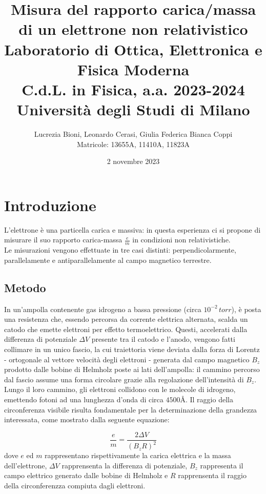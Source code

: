 \documentclass[]{article}
\title{%
    \Huge Misura del rapporto carica/massa di un elettrone non relativistico \\
    \Large Laboratorio di Ottica, Elettronica e Fisica Moderna \\ C.d.L. in Fisica, a.a. 2023-2024 \\ Università degli Studi di Milano}
\author{\LARGE Lucrezia Bioni, Leonardo Cerasi, Giulia Federica Bianca Coppi \\ Matricole: 13655A, 11410A, 11823A}
\date{2 novembre 2023}
\let\oldsection\section%
\renewcommand{\section}{%
	\renewcommand{\theequation}{\thesection.\arabic{equation}}%
	\oldsection}%
\let\oldsubsection\subsection%
\renewcommand{\subsection}{%
	\renewcommand{\theequation}{\thesubsection.\arabic{equation}}%
	\oldsubsection}%
\begin{document}
    \maketitle

    \section{Introduzione}

    L'elettrone è una particella carica e massiva: in questa esperienza ci si propone di misurare il suo rapporto carica-massa $ \frac{e}{m} $ in condizioni non relativistiche. \\
    Le misurazioni vengono effettuate in tre casi distinti: perpendicolarmente, parallelamente e antiparallelamente al campo magnetico terrestre.


    \subsection{Metodo}
    In un'ampolla contenente gas idrogeno a bassa pressione (circa $ 10^{-2}\, torr $), è posta una resistenza che, essendo percorsa da corrente elettrica alternata, scalda un catodo che emette elettroni per effetto termoelettrico. Questi, accelerati dalla differenza di potenziale $\Delta V$ presente tra il catodo e l'anodo, vengono fatti collimare in un unico fascio, la cui traiettoria viene deviata dalla forza di Lorentz - ortogonale al vettore velocità degli elettroni - generata dal campo magnetico $ B_z $ prodotto dalle bobine di Helmholz poste ai lati dell'ampolla: il cammino percorso dal fascio assume una forma circolare grazie alla regolazione dell'intensità di $B_z$. \\

    Lungo il loro cammino, gli elettroni collidono con le molecole di idrogeno, emettendo fotoni ad una lunghezza d'onda di circa $4500 \text{Å}$.
    Il raggio della circonferenza visibile risulta fondamentale per la determinazione della grandezza interessata, come mostrato dalla seguente equazione:

    \begin{equation}
        \label{e_m}
        \frac{e}{m} = \frac{2 \Delta V}{(B_z R)^2}
    \end{equation}
    dove $ e $ ed $ m $ rappresentano rispettivamente la carica elettrica e la massa dell'elettrone, $\Delta V$ rapprensenta la differenza di potenziale, $B_z$ rappresenta il campo elettrico generato dalle bobine di Helmholz e $ R $ rapprensenta il raggio della circonferenzza compiuta dagli elettroni. \\
\end{document}
